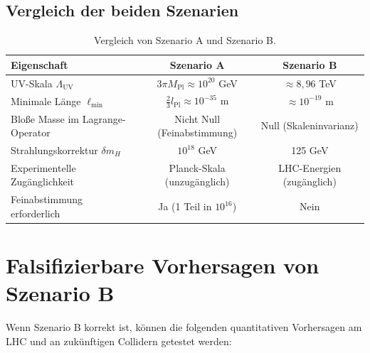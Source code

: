 \documentclass[11pt,a4paper]{article}
\newcommand{\Mpl}{M_{\mathrm{Pl}}}
\newcommand{\Lpl}{l_{\mathrm{Pl}}}
\newcommand{\Lmin}{\ell_{\min}}
\newcommand{\LUV}{\Lambda_{\mathrm{UV}}}
\theoremstyle{remark}
\begin{document}
	\subsection{Vergleich der beiden Szenarien}
	
	\begin{table}[H]
		\centering
		\caption{Vergleich von Szenario A und Szenario B.}
		\label{tab:scenarios}
		\small
		\begin{tabular}{@{}lcc@{}}
			\toprule
			\textbf{Eigenschaft} & \textbf{Szenario A} & \textbf{Szenario B} \\
			\midrule
			UV-Skala \(\LUV\) & \(3\pi\Mpl \approx 10^{20}\) GeV & \(\approx 8,96\) TeV \\
			Minimale Länge \(\Lmin\) & \(\frac{2}{3}\Lpl \approx 10^{-35}\) m & \(\approx 10^{-19}\) m \\
			Bloße Masse im Lagrange-Operator & Nicht Null (Feinabstimmung) & Null (Skaleninvarianz) \\
			Strahlungskorrektur \(\delta m_H\) & \(10^{18}\) GeV & 125 GeV \\
			Experimentelle Zugänglichkeit & Planck-Skala (unzugänglich) & LHC-Energien (zugänglich) \\
			Feinabstimmung erforderlich & Ja (1 Teil in \(10^{16}\)) & Nein \\
			\bottomrule
		\end{tabular}
	\end{table}
	
	\section{Falsifizierbare Vorhersagen von Szenario B}
	\label{sec:predictions}
	
	Wenn Szenario B korrekt ist, können die folgenden quantitativen Vorhersagen am LHC und an zukünftigen Collidern getestet werden:
	
\end{document}
